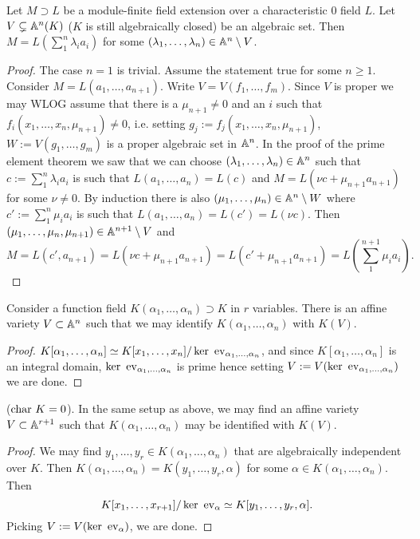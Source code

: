         \begin{proposition}
            Let $M\supset L$ be a module-finite field extension over a characteristic $0$ field $L$. Let $V\subsetneq \mathbb{A}^n(K)$ ($K$ is still algebraically closed) be an algebraic set. Then $M=L\left(\sum_1^n \lambda_ia_i\right)$ for some $(\lambda_1,\dots,\lambda_n)\in \mathbb{A}^n\setminus V$. 
        \end{proposition}
        \begin{proof}
            The case $n=1$ is trivial. Assume the statement true for some $n\geq 1$. Consider $M=L(a_1,\dots,a_{n+1})$. Write $V=V(f_1,\dots,f_m)$. Since $V$ is proper we may WLOG assume that there is a $\mu_{n+1}\neq 0$ and an $i$ such that $f_i(x_1,\dots,x_n,\mu_{n+1})\neq0$, i.e. setting $g_j:= f_j(x_1,\dots,x_n,\mu_{n+1})$, $W:= V(g_1,\dots,g_m)$ is a proper algebraic set in $\mathbb{A}^n$. In the proof of the prime element theorem we saw that we can choose $(\lambda_1,\dots,\lambda_n)\in \mathbb{A}^n$ such that $c:=\sum_1^n \lambda_ia_i$ is such that $L(a_1,\dots,a_n)=L(c)$ and $M=L(\nu c+\mu_{n+1} a_{n+1})$ for some $\nu \neq 0$. By induction there is also $(\mu_1,\dots,\mu_n)\in \mathbb{A}^n\setminus W$ where $c':=\sum_1^n \mu_ia_i$ is such that $L(a_1,\dots,a_n)=L(c')=L(\nu c)$. Then $(\mu_1,\dots,\mu_n,\mu_{n+1})\in \mathbb{A}^{n+1}\setminus V$ and $$M=L(c',a_{n+1})=L(\nu c+\mu_{n+1} a_{n+1})=L(c'+\mu_{n+1} a_{n+1})=L\left(\sum_1^{n+1} \mu_ia_i\right).$$ 
        \end{proof}
        \begin{proposition}
            Consider a function field $K(\alpha_1,\dots,\alpha_n)\supset K$ in $r$ variables. There is an affine variety $V\subset \mathbb{A}^n$ such that we may identify $K(\alpha_1,\dots,\alpha_n)$ with $K(V)$.
        \end{proposition}
        \begin{proof}
            $K[\alpha_1,\dots,\alpha_n]\simeq K[x_1,\dots,x_n]/\ker \ \mathrm{ev}_{\alpha_1,\dots,\alpha_n}$, and since $K[\alpha_1,\dots,\alpha_n]$ is an integral domain, $\ker\ \ev_{\alpha_1,\dots,\alpha_n}$ is prime hence setting $V:=V(\ker \ \mathrm{ev}_{\alpha_1,\dots,\alpha_n})$ we are done. 
        \end{proof}
        \begin{proposition}\label{WeMayIdentifyAFuntionFieldWithFunctionFieldOverVariety}
            ($\mathrm{char} \ K=0$). In the same setup as above, we may find an affine variety $V\subset \mathbb{A}^{r+1}$ such that $K(\alpha_1,\dots,\alpha_n)$ may be identified with $K(V)$.
        \end{proposition}
        \begin{proof}
            We may find $y_1,\dots,y_r\in K(\alpha_1,\dots,\alpha_n)$ that are algebraically independent over $K$. Then $K(\alpha_1,\dots,\alpha_n)=K(y_1,\dots,y_r,\alpha)$ for some $\alpha\in K(\alpha_1,\dots,\alpha_n)$. Then 
            $$K[x_1,\dots,x_{r+1}]/\ker\ \mathrm{ev}_\alpha \simeq K[y_1,\dots,y_r,\alpha].$$
             Picking $V := V(\ker \ \mathrm{ev}_\alpha)$, we are done.
        \end{proof}
